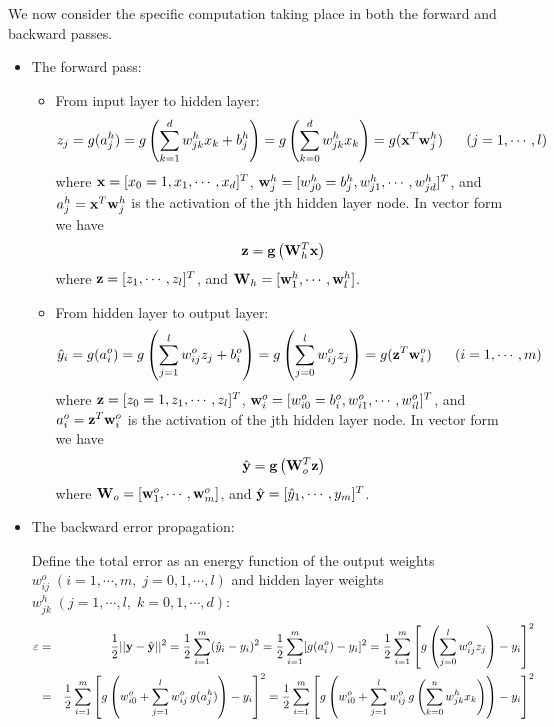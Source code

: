 \documentclass{article}
\begin{document}
We now consider the specific computation taking place in both the 
forward and backward passes.
\begin{itemize}
\item The forward pass:

  \begin{itemize}
  \item From input layer to hidden layer:
    \begin{equation}
      z_j=g(a^h_j)=g\left(\sum_{k=1}^d w_{jk}^h x_k+b_j^h\right)
      =g\left(\sum_{k=0}^d w_{jk}^h x_k\right)=g({\bf x}^T{\bf w}^h_j)
      \;\;\;\;\;\;(j=1,\cdots,l) 
      \label{BPNHidden}
    \end{equation}
    where ${\bf x}=[x_0=1,x_1,\cdots,x_d]^T$,
    ${\bf w}_j^h=[w_{j0}^h=b_j^h,w_{j1}^h,\cdots,w_{jd}^h]^T$, and
    $a^h_j={\bf x}^T{\bf w}^h_j$ is the activation of the jth hidden 
    layer node. In vector form we have
    \begin{equation}
      {\bf z}={\bf g}\left({\bf W}_h^T{\bf x}\right)
    \end{equation}
    where ${\bf z}=[z_1,\cdots,z_l]^T$, and
    ${\bf W}_h=[{\bf w}^h_1,\cdots,{\bf w}^h_l]$.

  \item From hidden layer to output layer:
    \begin{equation}
      \hat{y}_i=g(a_i^o)=g\left(\sum_{j=1}^l w_{ij}^o z_j+b_i^o\right)
      =g\left(\sum_{j=0}^l w_{ij}^o z_j\right)=g({\bf z}^T{\bf w}^o_i)
      \;\;\;\;\;\;(i=1,\cdots,m) 
      \label{BPNOutput}
    \end{equation}
    where ${\bf z}=[z_0=1,z_1,\cdots,z_l]^T$, 
    ${\bf w}_i^o=[w_{i0}^o=b_i^o,w_{i1}^o,\cdots,w_{il}^o]^T$, and 
    $a^o_i={\bf z}^T{\bf w}^o_i$ is the activation of the jth hidden 
    layer node. In vector form we have
    \begin{equation}
      \hat{\bf y}={\bf g}\left( {\bf W}_o^T{\bf z} \right)
    \end{equation}
    where ${\bf W}_o=[{\bf w}^o_1,\cdots,{\bf w}^o_m]$, and
    $\hat{\bf y}=[\hat{y}_1,\cdots,y_m]^T$. 
  \end{itemize}

\item The backward error propagation:

  Define the total error as an energy function of the output weights
  $w_{ij}^o\;(i=1,\cdots,m,\;j=0,1,\cdots,l)$ and hidden layer weights 
  $w_{jk}^h\;(j=1,\cdots,l,\;k=0,1,\cdots,d)$:
  \begin{eqnarray}
    \varepsilon &=&\frac{1}{2}||{\bf y}-\hat{\bf y}||^2 
    =\frac{1}{2}\sum_{i=1}^m(\hat{y}_i-y_i)^2=\frac{1}{2}\sum_{i=1}^m[g(a^o_i)-y_i]^2
    =\frac{1}{2}\sum_{i=1}^m\left[g\left(\sum_{j=0}^lw_{ij}^{o}z_j\right)-y_i\right]^2
    \nonumber \\
    &=&\frac{1}{2}\sum_{i=1}^m\left[g\left(w_{i0}^o+\sum_{j=1}^l w_{ij}^o\,
      g(a_j^h)\right)-y_i\right]^2
    =\frac{1}{2}\sum_{i=1}^m\left[g\left(w_{i0}^o+\sum_{j=1}^l w_{ij}^o\,
      g\left(\sum_{k=0}^n w_{jk}^hx_k\right)\right)-y_i\right]^2
  \end{eqnarray}


\end{itemize}
\end{document}
